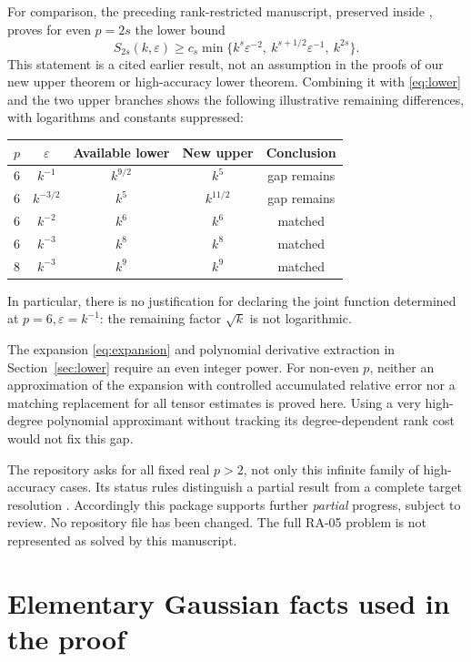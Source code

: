 \documentclass[11pt]{article}
\theoremstyle{remark}\newtheorem{remark}[theorem]{Remark}
\newcommand{\eps}{\varepsilon}\newcommand{\Sym}{\operatorname{Sym}}
\begin{document}
For comparison, the preceding rank-restricted manuscript, preserved inside \cite{prior}, proves for even $p=2s$ the lower bound
\begin{equation}\label{eq:priorlower}
 S_{2s}(k,\eps)\ge c_s\min\{k^s\eps^{-2},\ k^{s+1/2}\eps^{-1},\ k^{2s}\}.
\end{equation}
This statement is a cited earlier result, not an assumption in the proofs of our new upper theorem or high-accuracy lower theorem. Combining it with \eqref{eq:lower} and the two upper branches shows the following illustrative remaining differences, with logarithms and constants suppressed:
\begin{center}
\begin{tabular}{ccccc}
\toprule
$p$ & $\eps$ & Available lower & New upper & Conclusion\\
\midrule
$6$ & $k^{-1}$ & $k^{9/2}$ & $k^5$ & gap remains\\
$6$ & $k^{-3/2}$ & $k^5$ & $k^{11/2}$ & gap remains\\
$6$ & $k^{-2}$ & $k^6$ & $k^6$ & matched\\
$6$ & $k^{-3}$ & $k^8$ & $k^8$ & matched\\
$8$ & $k^{-3}$ & $k^9$ & $k^9$ & matched\\
\bottomrule
\end{tabular}
\end{center}
In particular, there is no justification for declaring the joint function determined at $p=6,\eps=k^{-1}$: the remaining factor $\sqrt k$ is not logarithmic.

The expansion \eqref{eq:expansion} and polynomial derivative extraction in Section~\ref{sec:lower} require an even integer power. For non-even $p$, neither an approximation of the expansion with controlled accumulated relative error nor a matching replacement for all tensor estimates is proved here. Using a very high-degree polynomial approximant without tracking its degree-dependent rank cost would not fix this gap.

The repository asks for all fixed real $p>2$, not only this infinite family of high-accuracy cases. Its status rules distinguish a partial result from a complete target resolution \cite{status}. Accordingly this package supports further \emph{partial} progress, subject to review. No repository file has been changed. The full RA-05 problem is not represented as solved by this manuscript.

\appendix
\section{Elementary Gaussian facts used in the proof}\label{app:gaussian}
\end{document}
